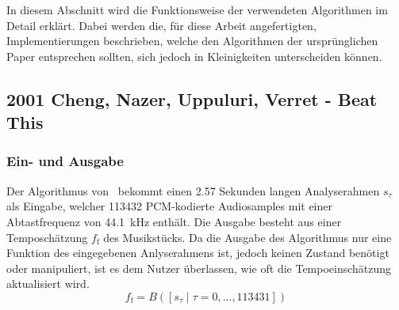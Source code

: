 {


	In diesem Abschnitt wird die Funktionsweise der verwendeten Algorithmen im Detail erklärt.
	Dabei werden die, für diese Arbeit angefertigten, Implementierungen beschrieben,
		welche den Algorithmen der ursprünglichen Paper entsprechen sollten,
		sich jedoch in Kleinigkeiten unterscheiden können.

	\subsection{2001 Cheng, Nazer, Uppuluri, Verret - Beat This}
	{
		\subsubsection*{Ein- und Ausgabe}
		{
			Der Algorithmus von~\cite{2001_BeatThis} bekommt einen \num{2.57} Sekunden langen Analyserahmen $s_\tau$ als Eingabe,
				welcher \num{113432} PCM-kodierte Audiosamples mit einer Abtastfrequenz von \SI{44.1}{\kilo\hertz} enthält.
			Die Ausgabe besteht aus einer Temposchätzung $f_\text{f}$ des Musikstücks.
			Da die Ausgabe des Algorithmus nur eine Funktion des eingegebenen Anlyserahmens ist,
				jedoch keinen Zustand benötigt oder manipuliert,
				ist es dem Nutzer überlassen,
				wie oft die Tempoeinschätzung aktualisiert wird.
			\begin{equation}
				f_\text{f} = B([s_\tau \mid \tau = 0, ..., 113431])
			\end{equation}
		}

}}
